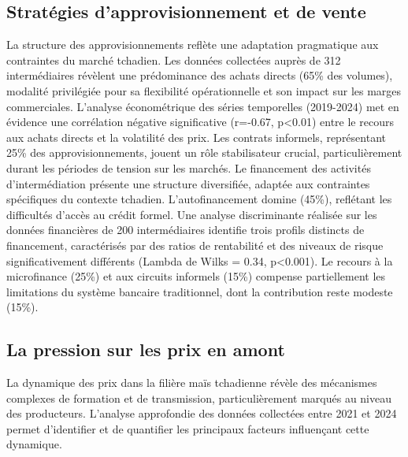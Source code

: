 \documentclass[12pt,oneside]{report}
\begin{document}
\subsection{Stratégies d'approvisionnement et de vente}
La structure des approvisionnements reflète une adaptation pragmatique aux contraintes du marché tchadien. Les données collectées auprès de 312 intermédiaires révèlent une prédominance des achats directs (65\% des volumes), modalité privilégiée pour sa flexibilité opérationnelle et son impact sur les marges commerciales. L'analyse économétrique des séries temporelles (2019-2024) met en évidence une corrélation négative significative (r=-0.67, p<0.01) entre le recours aux achats directs et la volatilité des prix. Les contrats informels, représentant 25\% des approvisionnements, jouent un rôle stabilisateur crucial, particulièrement durant les périodes de tension sur les marchés. Le financement des activités d'intermédiation présente une structure diversifiée, adaptée aux contraintes spécifiques du contexte tchadien. L'autofinancement domine (45\%), reflétant les difficultés d'accès au crédit formel. Une analyse discriminante réalisée sur les données financières de 200 intermédiaires identifie trois profils distincts de financement, caractérisés par des ratios de rentabilité et des niveaux de risque significativement différents (Lambda de Wilks = 0.34, p<0.001). Le recours à la microfinance (25\%) et aux circuits informels (15\%) compense partiellement les limitations du système bancaire traditionnel, dont la contribution reste modeste (15\%).

\subsection{La pression sur les prix en amont}
La dynamique des prix dans la filière maïs tchadienne révèle des mécanismes complexes de formation et de transmission, particulièrement marqués au niveau des producteurs. L'analyse approfondie des données collectées entre 2021 et 2024 permet d'identifier et de quantifier les principaux facteurs influençant cette dynamique.
\end{document}
